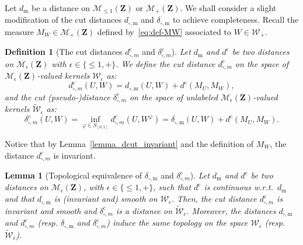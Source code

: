 \documentclass{amsart}
\newcommand{\wrt}{w.r.t.\ }
\theoremstyle{plain}
\newtheorem{lemme}[Th]{Lemma}
\newtheorem{defin}[Th]{Definition}
\theoremstyle{definition}
\newcommand{\Space}{\mathbf{Z}}
\newcommand{\SubProba}{\mathcal{M}_{\leq1}(\Space)}
\newcommand{\Meas}{\mathcal{M}_+(\Space)}
\newcommand{\MeasEps}{\mathcal{M}_{\epsilon}(\Space)}
\newcommand{\Kernelp}{\mathcal{W}_{+}}
\newcommand{\KernelEps}{\mathcal{W}_{\epsilon}}
\newcommand{\UKernelEps}{\widetilde{\mathcal{W}}_{\epsilon}}
\newcommand{\InvRelabel}{S_{[0,1]}}
\newcommand{\m}{\mathrm{m}}
\newcommand{\dmeas}{d_\m}
\newcommand{\dcut}{d_{\square,\m}}
\newcommand{\ddcut}{\delta_{\square,\m}}
\newcommand{\ccc}{\mathrm{c}}
\newcommand{\dmeasC}{d^\ccc}
\newcommand{\dcutC}{d^\ccc_{\square, m}}
\newcommand{\ddcutC}{\delta^\ccc_{\square, m}}
\begin{document}
Let $\dmeas$ be a distance on $\SubProba$ or $\Meas$. 
We shall consider a slight modification of the cut
distances $\dcut$ and $\ddcut$ to  achieve completeness. 
Recall the measure $M_W\in \Meas$  defined by~\eqref{eq:def-MW}
associated to $W\in\Kernelp$.

\begin{defin}[The cut distances $\dcutC$ and $\ddcutC$]\label{ref_dist_complete}
Let $\dmeas$ and  $\dmeasC$ be two distances on $\MeasEps$ with $\epsilon\in\{\leq 1, +\}$.
We define the cut distance $\dcutC$ on the space of $\MeasEps$-valued kernels $\KernelEps$ as:
\begin{equation*}
\dcutC(U,W) = \dcut(U,W) + \dmeasC(M_U,M_W)  ,
\end{equation*}
and the cut (pseudo-)distance $\ddcutC$  on the space of 
	unlabeled $\MeasEps$-valued kernels $\UKernelEps$ as:
\begin{equation*}
\ddcutC(U,W) = \inf_{\varphi \in \InvRelabel} \dcutC(U,W^\varphi)	= 
\ddcut(U,W) + \dmeasC(M_U,M_W)		 .
\end{equation*}
\end{defin}
Notice that by Lemma~\ref{lemma_dcut_invariant}
and the definition of $M_W$, the distance $\dcutC$ is invariant. 


\begin{lemme}[Topological equivalence of $\ddcut$ and $\ddcutC$]
\label{lem:ddC-metrique}
Let $\dmeas$  and $\dmeasC$  be two distances  on $\MeasEps$, with $\epsilon\in\{\leq 1, +\}$,
such that $\dmeasC$  is    continuous  \wrt $\dmeas$  
and  that $\dcut$  is
(invariant and) smooth  on $\KernelEps$.  Then, the  cut distance $\dcutC$
is  invariant and  smooth  and  $\ddcutC$  is  a  distance  on  $\UKernelEps$.
Moreover, the distances $\dcut$ and $\dcutC$ (resp. $\ddcut$ and  $\ddcutC$) induce the same topology
on the space $\KernelEps$ (resp. $\UKernelEps$).
\end{lemme}
\end{document}
